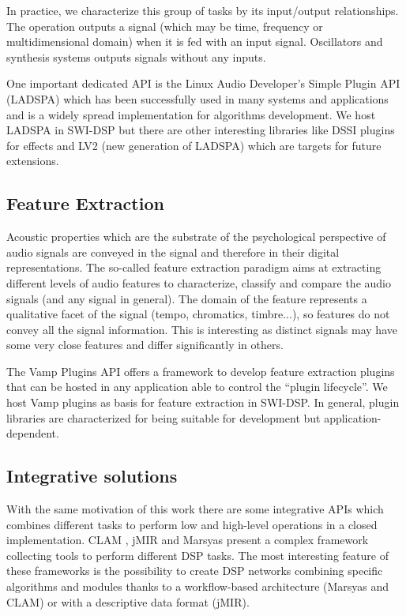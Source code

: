 \documentclass[runningheads]{llncs}
\begin{document}
In practice, we characterize this group of tasks by its input/output relationships. The operation outputs a signal (which may be time, frequency or multidimensional domain) when it is fed with an input signal. Oscillators and synthesis systems outputs signals without any inputs.

One important dedicated API is the Linux Audio Developer's Simple Plugin API (LADSPA) \cite{ladspa}  which has been successfully used in many systems and applications and is a widely spread implementation for algorithms development. We host LADSPA in SWI-DSP but there are other interesting libraries like DSSI plugins for effects and LV2 (new generation of LADSPA) which are targets for future extensions.

\subsection{Feature Extraction}\label{subsec:feature}

Acoustic properties which are the substrate of the psychological perspective of audio signals are conveyed in the signal and therefore in their digital representations. The so-called feature extraction paradigm aims at extracting different levels of audio features to characterize, classify and compare the audio signals (and any signal in general). The domain of the feature represents a qualitative facet of the signal (tempo, chromatics, timbre...), so features do not convey all the signal information. This is interesting as distinct signals may have some very close features and differ significantly in others.

The Vamp Plugins API \cite{vamp} offers a framework to develop feature extraction plugins that can be hosted in any application able to control the ``plugin lifecycle''. We host Vamp plugins as basis for feature extraction in SWI-DSP. In general, plugin libraries are characterized for being suitable for development but application-dependent.

\subsection{Integrative solutions}\label{subsec:inte}

With the same motivation of this work there are some integrative APIs which combines different tasks to perform low and high-level operations in a closed implementation. CLAM \cite{clam}, jMIR \cite{jmir} and Marsyas \cite{marsyas} present a complex framework collecting tools to perform different DSP tasks. The most interesting feature of these frameworks is the possibility to create DSP networks combining specific algorithms and modules thanks to a workflow-based architecture (Marsyas and CLAM) or with a descriptive data format (jMIR).
\end{document}

